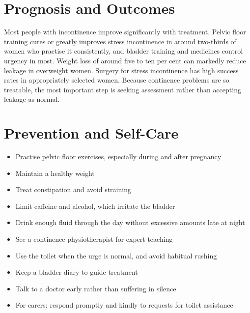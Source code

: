 \section*{Prognosis and Outcomes}
Most people with incontinence improve significantly with treatment. Pelvic floor training cures or greatly improves stress incontinence in around two-thirds of women who practise it consistently, and bladder training and medicines control urgency in most. Weight loss of around five to ten per cent can markedly reduce leakage in overweight women. Surgery for stress incontinence has high success rates in appropriately selected women. Because continence problems are so treatable, the most important step is seeking assessment rather than accepting leakage as normal.

\section*{Prevention and Self-Care}
\begin{itemize}
    \item Practise pelvic floor exercises, especially during and after pregnancy
    \item Maintain a healthy weight
    \item Treat constipation and avoid straining
    \item Limit caffeine and alcohol, which irritate the bladder
    \item Drink enough fluid through the day without excessive amounts late at night
    \item See a continence physiotherapist for expert teaching
    \item Use the toilet when the urge is normal, and avoid habitual rushing
    \item Keep a bladder diary to guide treatment
    \item Talk to a doctor early rather than suffering in silence
    \item For carers: respond promptly and kindly to requests for toilet assistance
\end{itemize}

